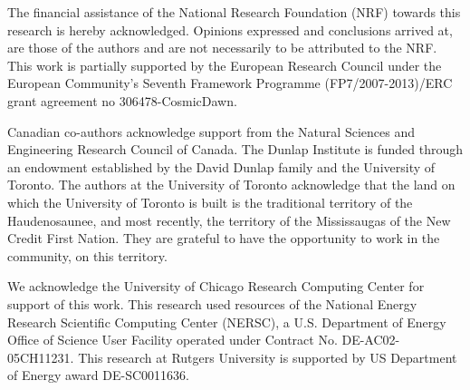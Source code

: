 \documentclass[\docopts]{\docclass}
\begin{document}
The financial assistance of the National Research Foundation (NRF) towards this research is hereby acknowledged.
Opinions expressed and conclusions arrived at, are those of the authors and are not necessarily to be attributed to the NRF.
This work is partially supported by the European Research Council under the European Community’s Seventh Framework Programme (FP7/2007-2013)/ERC grant agreement no 306478-CosmicDawn.

Canadian co-authors acknowledge support from the Natural Sciences and Engineering Research Council of Canada.
The Dunlap Institute is funded through an endowment established by the David Dunlap family and the University of Toronto.
The authors at the University of Toronto acknowledge that the land on which the University of Toronto is built is the traditional territory of the Haudenosaunee, and most recently, the territory of the Mississaugas of the New Credit First Nation.
They are grateful to have the opportunity to work in the community, on this territory.

We acknowledge the University of Chicago Research Computing Center for support of this work.
This research used resources of the National Energy Research Scientific Computing Center (NERSC), a U.S. Department of Energy Office of Science User Facility operated under Contract No. DE-AC02-05CH11231.
This research at Rutgers University is supported by US Department of Energy award DE-SC0011636.



%
%




\end{document}
